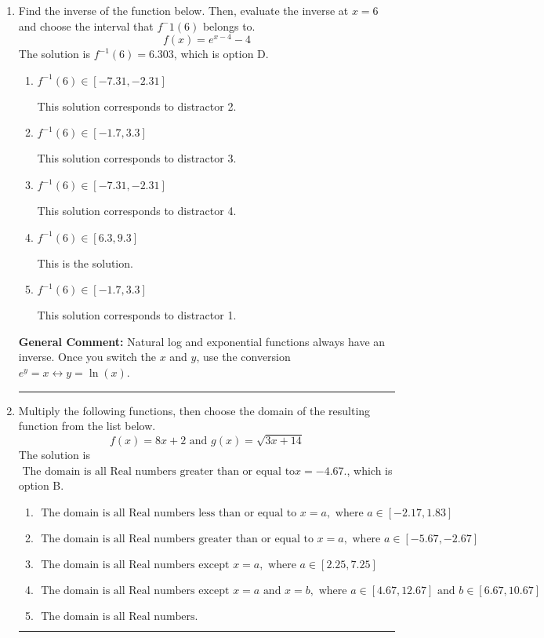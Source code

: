 \documentclass{extbook}[14pt]
\newcommand{\litem}[1]{\item #1

\rule{\textwidth}{0.4pt}}
\begin{document}
\begin{enumerate}\litem{
Find the inverse of the function below. Then, evaluate the inverse at $x = 6$ and choose the interval that $f^-1(6)$ belongs to.
\[ f(x) = e^{x-4}-4 \]The solution is \( f^{-1}(6) = 6.303 \), which is option D.\begin{enumerate}[label=\Alph*.]
\item \( f^{-1}(6) \in [-7.31, -2.31] \)

 This solution corresponds to distractor 2.
\item \( f^{-1}(6) \in [-1.7, 3.3] \)

 This solution corresponds to distractor 3.
\item \( f^{-1}(6) \in [-7.31, -2.31] \)

 This solution corresponds to distractor 4.
\item \( f^{-1}(6) \in [6.3, 9.3] \)

 This is the solution.
\item \( f^{-1}(6) \in [-1.7, 3.3] \)

 This solution corresponds to distractor 1.
\end{enumerate}

\textbf{General Comment:} Natural log and exponential functions always have an inverse. Once you switch the $x$ and $y$, use the conversion $ e^y = x \leftrightarrow y=\ln(x)$.
}
\litem{
Multiply the following functions, then choose the domain of the resulting function from the list below.
\[ f(x) = 8x + 2 \text{ and } g(x) = \sqrt{3x+14}  \]The solution is \( \text{ The domain is all Real numbers greater than or equal to} x = -4.67. \), which is option B.\begin{enumerate}[label=\Alph*.]
\item \( \text{ The domain is all Real numbers less than or equal to } x = a, \text{ where } a \in [-2.17, 1.83] \)


\item \( \text{ The domain is all Real numbers greater than or equal to } x = a, \text{ where } a \in [-5.67, -2.67] \)


\item \( \text{ The domain is all Real numbers except } x = a, \text{ where } a \in [2.25, 7.25] \)


\item \( \text{ The domain is all Real numbers except } x = a \text{ and } x = b, \text{ where } a \in [4.67, 12.67] \text{ and } b \in [6.67, 10.67] \)


\item \( \text{ The domain is all Real numbers. } \)



\end{enumerate}}
\end{enumerate}
\end{document}
